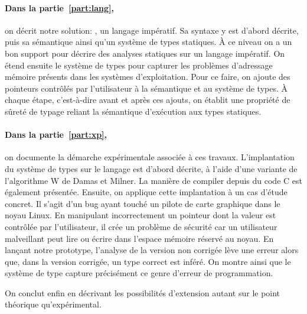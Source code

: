 \paragraph{Dans la partie~\ref{part:lang},} on décrit notre solution:
\langname{}, un langage impératif. Sa syntaxe y est d'abord décrite, puis sa
sémantique ainsi qu'un système de types statiques. À ce niveau on a un bon
support pour décrire des analyses statiques sur un langage impératif. On étend
ensuite le système de types pour capturer les problèmes d'adressage mémoire
présents dans les systèmes d'exploitation. Pour ce faire, on ajoute des
pointeurs contrôlés par l'utilisateur à la sémantique et au système de types. À
chaque étape, c'est-à-dire avant et après ces ajouts, on établit une propriété
de sûreté de typage reliant la sémantique d'exécution aux types statiques.

\paragraph{Dans la partie~\ref{part:xp},} on documente la démarche expérimentale
associée à ces travaux. L'implantation du système de types sur le langage
\newspeak est d'abord décrite, à l'aide d'une variante de l'algorithme W de
Damas et Milner. La manière de compiler depuis du code C est également
présentée. Ensuite, on applique cette implantation à un cas d'étude concret. Il
s'agit d'un bug ayant touché un pilote de carte graphique dans le noyau Linux.
En manipulant incorrectement un pointeur dont la valeur est contrôlée par
l'utilisateur, il crée un problème de sécurité car un utilisateur malveillant
peut lire ou écrire dans l'espace mémoire réservé au noyau. En lançant notre
prototype, l'analyse de la version non corrigée lève une erreur alors que, dans
la version corrigée, un type correct est inféré. On montre ainsi que le système
de type capture précisément ce genre d'erreur de programmation.

On conclut enfin en décrivant les possibilités d'extension autant sur le point
théorique qu'expérimental.

